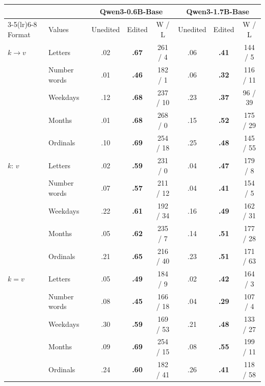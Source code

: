 \begin{tabular}{llcccccc}
\toprule
 & & \multicolumn{3}{c}{Qwen3-0.6B-Base} & \multicolumn{3}{c}{Qwen3-1.7B-Base} \\
\cmidrule(lr){3-5}\cmidrule(lr){6-8}
Format & Values & Unedited & Edited & W / L & Unedited & Edited & W / L \\
\midrule
$k \rightarrow v$ & Letters & .02 & \textbf{.67} & 261 / 4 & .06 & \textbf{.41} & 144 / 5 \\
 & Number words & .01 & \textbf{.46} & 182 / 1 & .06 & \textbf{.32} & 116 / 11 \\
 & Weekdays & .12 & \textbf{.68} & 237 / 10 & .23 & \textbf{.37} & 96 / 39 \\
 & Months & .01 & \textbf{.68} & 268 / 0 & .15 & \textbf{.52} & 175 / 29 \\
 & Ordinals & .10 & \textbf{.69} & 254 / 18 & .25 & \textbf{.48} & 145 / 55 \\
\midrule
$k$: $v$ & Letters & .02 & \textbf{.59} & 231 / 0 & .04 & \textbf{.47} & 179 / 8 \\
 & Number words & .07 & \textbf{.57} & 211 / 12 & .04 & \textbf{.41} & 154 / 5 \\
 & Weekdays & .22 & \textbf{.61} & 192 / 34 & .16 & \textbf{.49} & 162 / 31 \\
 & Months & .05 & \textbf{.62} & 235 / 7 & .14 & \textbf{.51} & 177 / 28 \\
 & Ordinals & .21 & \textbf{.65} & 216 / 40 & .23 & \textbf{.51} & 171 / 63 \\
\midrule
$k = v$ & Letters & .05 & \textbf{.49} & 184 / 9 & .02 & \textbf{.42} & 164 / 3 \\
 & Number words & .08 & \textbf{.45} & 166 / 18 & .04 & \textbf{.29} & 107 / 4 \\
 & Weekdays & .30 & \textbf{.59} & 169 / 53 & .21 & \textbf{.48} & 133 / 27 \\
 & Months & .09 & \textbf{.69} & 254 / 15 & .08 & \textbf{.55} & 199 / 11 \\
 & Ordinals & .24 & \textbf{.60} & 182 / 41 & .26 & \textbf{.41} & 118 / 58 \\
\bottomrule
\end{tabular}
